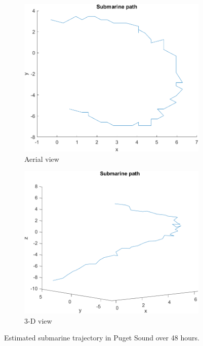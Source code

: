 \documentclass{article}
\begin{document}
\begin{figure}[!t]
	\centering
	\begin{subfigure}{.5\textwidth}
		\centering
		\includegraphics[width=0.9\linewidth]{path_xy}    	
		\caption{Aerial view}
	\end{subfigure}%
	\begin{subfigure}{.5\textwidth}
		\centering
		\includegraphics[width=0.9\linewidth]{path_xyz}    	
		\caption{3-D view}
	\end{subfigure}
	\caption{Estimated submarine trajectory in Puget Sound over 48 hours.}
	\label{fig:trajectory}
\end{figure}
\end{document}
